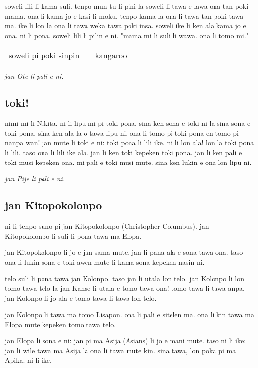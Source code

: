 soweli lili li kama suli.
tenpo mun tu li pini la soweli li tawa e lawa ona tan poki mama.
ona li kama jo e kasi li moku.
tenpo kama la ona li tawa tan poki tawa ma.
ike li lon la ona li tawa weka tawa poki insa.
soweli ike li ken ala kama jo e ona.
ni li pona.
soweli lili li pilin e ni.
"mama mi li suli li wawa.
ona li tomo mi."

\begin{supertabular}{p{5,5cm}|ll}
    soweli pi poki sinpin &  & kangaroo \\
\end{supertabular}

\textit{jan Ote li pali e ni. \cite{www:sowelitoki:01}}

\subsection{toki!}
nimi mi li Nikita. ni li lipu mi pi toki pona. sina ken sona e toki ni la sina sona e toki pona. sina ken ala la o tawa lipu ni. ona li tomo pi toki pona en tomo pi nanpa wan!
jan mute li toki e ni: toki pona li lili ike. ni li lon ala! lon la toki pona li lili. taso ona li lili ike ala. jan li ken toki kepeken toki pona. jan li ken pali e toki musi kepeken ona.
mi pali e toki musi mute. sina ken lukin e ona lon lipu ni.

\textit{jan Pije li pali e ni. \cite{www:Pije:01}}

\newpage

\subsection{jan Kitopokolonpo}
ni li tenpo suno pi jan Kitopokolonpo (Christopher Columbus).
jan Kitopokolonpo li suli li pona tawa ma Elopa.

jan Kitopokolonpo li jo e jan sama mute.
jan li pana ala e sona tawa ona.
taso ona li lukin sona e toki awen mute li kama sona kepeken nasin ni.

telo suli li pona tawa jan Kolonpo.
taso jan li utala lon telo.
jan Kolonpo li lon tomo tawa telo la jan Kanse li utala e tomo tawa ona!
tomo tawa li tawa anpa. jan Kolonpo li jo ala e tomo tawa li tawa lon
telo.

jan Kolonpo li tawa ma tomo Lisapon. ona li pali e sitelen ma. ona li
kin tawa ma Elopa mute kepeken tomo tawa telo.

jan Elopa li sona e ni: jan pi ma Asija (Asians) li jo e mani mute.
taso ni li ike: jan li wile tawa ma Asija la ona li tawa mute kin.
sina tawa, lon poka pi ma Apika. ni li ike.

